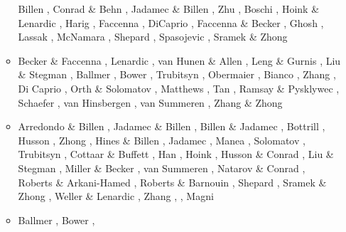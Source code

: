 \begin{itemize}
\begin{scriptsize}
\begin{itemize}
                 Billen \cite{bill10}, Conrad \& Behn \cite{cobe10},
                 Jadamec \& Billen \cite{jabi10}, Zhu \etal \cite{zhst10},
                 Boschi \etal \cite{bofb10}, Hoink \& Lenardic \cite{hole10},
                 Harig \etal \cite{hazs10}, Faccenna \cite{fabl10},
                 DiCaprio \etal \cite{dimg10}, Faccenna \& Becker \cite{fabe10},
                 Ghosh \etal \cite{ghbz10}, Lassak \etal \cite{lamg10},
                 McNamara \etal \cite{mcgr10}, Shepard \etal \cite{shml10},
                 Spasojevic \etal \cite{spgs10a,spgs10b}, Sramek \& Zhong \cite{srzh10}
\item[\twothousandeleven] Becker \& Faccenna \cite{befa11}, Lenardic \etal \cite{lemj11},
                    van Hunen \& Allen \cite{vaal11}, Leng \& Gurnis \cite{legu11},
                    Liu \& Stegman \cite{list11}, Ballmer \etal \cite{baiv11},
                    Bower \etal \cite{bowg11}, Trubitsyn \etal \cite{tree11},
                    Obermaier \etal \cite{obbh11}, Bianco \etal \cite{bics11}, 
                    Zhang \etal \cite{zhxy11}, Di Caprio \cite{digm11}, 
                    Orth \& Solomatov \cite{orso11}, Matthews \etal \cite{mahg11},
                    Tan \etal \cite{talz11}, Ramsay \& Pysklywec \cite{rapy11},
                    Schaefer \etal \cite{scbb11}, van Hinsbergen \cite{vasd11},
                    van Summeren \etal \cite{vacg11}, Zhang \& Zhong \cite{zhzh11}
\item[\twothousandtwelve] Arredondo \& Billen \cite{arbi12}, Jadamec \& Billen \cite{jabi12},
                    Billen \& Jadamec \cite{bija12}, Bottrill \etal \cite{bova12},
                    Husson \etal \cite{hucf12}, Zhong \etal \cite{zhym12},
                    Hines \& Billen \cite{hibi12}, Jadamec \etal \cite{jabk12},
                    Manea \etal \cite{mapm12}, Solomatov \cite{solo12}, 
                    Trubitsyn \cite{trub12}, Cottaar \& Buffett \cite{cobu12},
                    Han \etal \cite{hats12}, Hoink \etal \cite{holr12},
                    Husson \& Conrad \cite{huco12}, Liu \& Stegman \cite{list12},
                    Miller \& Becker \cite{mibe12}, van Summeren \etal \cite{vacl12},
                    Natarov \& Conrad \cite{naco12}, Roberts \& Arkani-Hamed \cite{roar12},
                    Roberts \& Barnouin \cite{roba12}, Shepard \etal \cite{shlm12},
                    Sramek \& Zhong \cite{srzh12}, Weller \& Lenardic \cite{wele12},
                    Zhang \etal \cite{zhzf12}, \cite{zams12},
                    Magni \etal \cite{mavf12}
\item[\twothousandthirteen] Ballmer \etal \cite{bacs13}, Bower \etal \cite{bogs13a,bogs13b},

\end{itemize}
\end{scriptsize}
\end{itemize}
